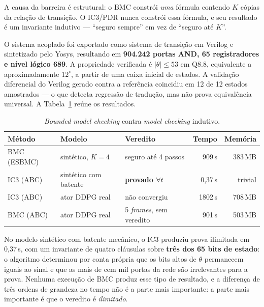 A causa da barreira é estrutural: o BMC constrói \emph{uma} fórmula contendo $K$ cópias da
relação de transição. O IC3/PDR nunca constrói essa fórmula, e seu resultado é um invariante
indutivo --- ``seguro sempre'' em vez de ``seguro até $K$''.

O sistema acoplado foi exportado como sistema de transição em Verilog e sintetizado pelo
Yosys, resultando em \textbf{904.242 portas AND, 65 registradores e nível lógico 689}. A
propriedade verificada é $|\theta| \le 53$ em Q8.8, equivalente a aproximadamente
$12^\circ$, a partir de uma caixa inicial de estados. A validação diferencial do Verilog
gerado contra a referência coincidiu em 12 de 12 estados amostrados --- o que detecta
regressão de tradução, mas não prova equivalência universal. A Tabela~\ref{tab:ic3} reúne os
resultados.

\begin{table}[H]
\centering
\caption{\textit{Bounded model checking} contra \textit{model checking} indutivo.}
\label{tab:ic3}
\small
\begin{tabular}{@{}lllrr@{}}
\toprule
\textbf{Método} & \textbf{Modelo} & \textbf{Veredito} & \textbf{Tempo} & \textbf{Memória} \\
\midrule
BMC (ESBMC) & sintético, $K{=}4$        & seguro até 4 passos           & 909\,s  & 383\,MB \\
IC3 (ABC)   & sintético com batente     & \textbf{provado $\forall t$}  & 0,37\,s & trivial \\
IC3 (ABC)   & ator DDPG real            & não convergiu                 & 1802\,s & 708\,MB \\
BMC (ABC)   & ator DDPG real            & 5 \textit{frames}, sem veredito & 901\,s & 503\,MB \\
\bottomrule
\end{tabular}
\end{table}

No modelo sintético com batente mecânico, o IC3 produziu prova ilimitada em 0,37\,s, com um
invariante de quatro cláusulas sobre \textbf{três dos 65 bits de estado}: o algoritmo
determinou por conta própria que os bits altos de $\theta$ permanecem iguais ao sinal e que as
mais de cem mil portas da rede são irrelevantes para a prova. Nenhuma execução de BMC produz
esse tipo de resultado, e a diferença de três ordens de grandeza no tempo não é a parte mais
importante: a parte mais importante é que o veredito é \emph{ilimitado}.

